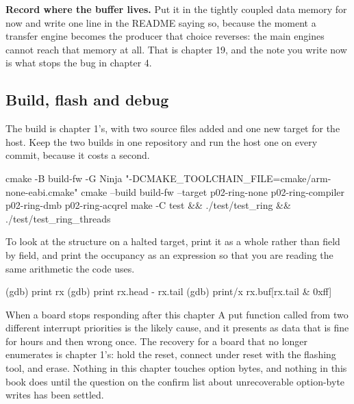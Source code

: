 \begin{steps}
\item \textbf{Record where the buffer lives.} Put it in the tightly coupled data
memory for now and write one line in the README saying so, because the moment a
transfer engine becomes the producer that choice reverses: the main engines
cannot reach that memory at all. That is chapter 19, and the note you write now
is what stops the bug in chapter 4.
\end{steps}

\subsection*{Build, flash and debug}


The build is chapter 1's, with two source files added and one new target for the
host. Keep the two builds in one repository and run the host one on every
commit, because it costs a second.

\begin{shellcode}
cmake -B build-fw -G Ninja "-DCMAKE_TOOLCHAIN_FILE=cmake/arm-none-eabi.cmake"
cmake --build build-fw --target p02-ring-none p02-ring-compiler \\
                               p02-ring-dmb p02-ring-acqrel
make -C test && ./test/test_ring && ./test/test_ring_threads
\end{shellcode}

To look at the structure on a halted target, print it as a whole rather than
field by field, and print the occupancy as an expression so that you are reading
the same arithmetic the code uses.

\begin{shellcode}
(gdb) print rx
(gdb) print rx.head - rx.tail
(gdb) print/x rx.buf[rx.tail & 0xff]
\end{shellcode}

\begin{note}{When a board stops responding after this chapter}
A put function called from two different interrupt priorities is the likely
cause, and it presents as data that is fine for hours and then wrong once. The
recovery for a board that no longer enumerates is chapter 1's: hold the reset,
connect under reset with the flashing tool, and erase. Nothing in this chapter
touches option bytes, and nothing in this book does until the question on the
confirm list about unrecoverable option-byte writes has been settled.
\end{note}

